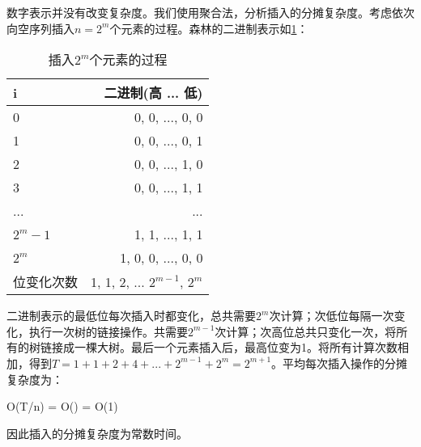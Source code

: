 \documentclass[b5paper]{ctexart}
\begin{document}
数字表示并没有改变复杂度。我们使用聚合法，分析插入的分摊复杂度。考虑依次向空序列插入$n = 2^m$个元素的过程。森林的二进制表示如\cref{tab:ralist-insertion}：

\begin{table}[htbp]
\centering
\begin{tabular}{|l|r|}
  \hline
  i & 二进制(高 ... 低) \\
  \hline
  0 & 0, 0, ..., 0, 0 \\
  1 & 0, 0, ..., 0, 1 \\
  2 & 0, 0, ..., 1, 0 \\
  3 & 0, 0, ..., 1, 1 \\
  ... & ... \\
  $2^m-1$ & 1, 1, ..., 1, 1 \\
  $2^m$ & 1, 0, 0, ..., 0, 0 \\
  \hline
  位变化次数 & 1, 1, 2, ... $2^{m-1}$, $2^m$ \\
  \hline
\end{tabular}
\caption{插入$2^m$个元素的过程}
\label{tab:ralist-insertion}
\end{table}

二进制表示的最低位每次插入时都变化，总共需要$2^m$次计算；次低位每隔一次变化，执行一次树的链接操作。共需要$2^{m-1}$次计算；次高位总共只变化一次，将所有的树链接成一棵大树。最后一个元素插入后，最高位变为1。将所有计算次数相加，得到$T = 1 + 1 + 2 + 4 + ... + 2^{m-1} + 2^m = 2^{m+1}$。平均每次插入操作的分摊复杂度为：

\be
O(T/n) = O() = O(1)
\ee

因此插入的分摊复杂度为常数时间。

\begin{Exercise}\label{ex:num-representaion}
\end{Exercise}
\end{document}
